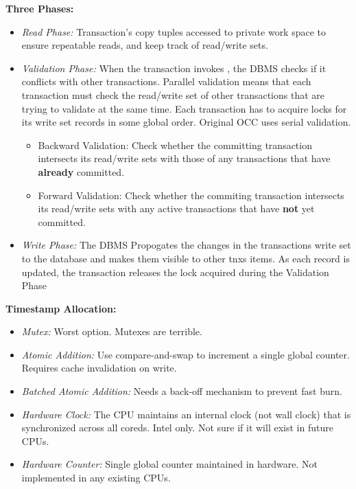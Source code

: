 \documentclass[11pt]{article}
\begin{document}
\textbf{Three Phases:}
\begin{itemize}
    \item \textit{Read Phase:}
    Transaction's copy tuples accessed to private work space to ensure repeatable reads, and keep 
    track of read/write sets.
    
    \item \textit{Validation Phase:}
    When the transaction invokes , the DBMS checks if it conflicts with other 
transactions.
    Parallel validation means that each transaction must check the read/write set of other 
transactions 
    that are trying to validate at the same time. Each transaction has to acquire locks for its 
write set 
    records in some global order. Original OCC uses serial validation.
    \begin{itemize}
        \item Backward Validation:
        Check whether the committing transaction intersects its read/write sets with those of any 
transactions that         have \textbf{already} committed.
        
        \item Forward Validation:
        Check whether the commiting transaction intersects its read/write sets with any active 
transactions that         have \textbf{not} yet committed.
    \end{itemize}
    
    \item \textit{Write Phase:}
    The DBMS Propogates the changes in the transactions write set to the database and makes them 
    visible to other tnxs items. As each record is updated, the transaction releases the lock 
acquired     during the Validation Phase
\end{itemize}

\textbf{Timestamp Allocation:}~\cite{p209-yu}
\begin{itemize}
    \item \textit{Mutex:}
    Worst option. Mutexes are terrible.
    
    \item \textit{Atomic Addition:}
    Use compare-and-swap to increment a single global counter. Requires cache invalidation on write.
    
    \item \textit{Batched Atomic Addition:}
    Needs a back-off mechanism to prevent fast burn.

    \item \textit{Hardware Clock:}
    The CPU maintains an internal clock (not wall clock) that is synchronized across all coreds.
    Intel only. Not sure if it will exist in future CPUs.
    
    \item \textit{Hardware Counter:}
    Single global counter maintained in hardware. Not implemented in any existing CPUs.
\end{itemize}
\end{document}
